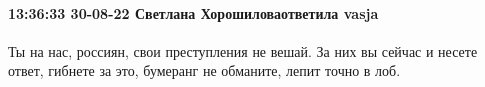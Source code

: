  
 
 
 
 

\paragraph{13:36:33 30-08-22 Светлана Хорошиловаответила vasja}

Ты на нас, россиян, свои преступления не вешай. За них вы сейчас и несете
ответ, гибнете за это, бумеранг не обманите, лепит точно в лоб.

